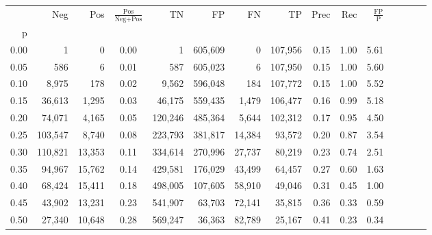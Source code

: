 \begin{tabular}{rrrcrrrrrrrrrrr}
\toprule
{} &      Neg &     Pos & $\frac{\text{Pos}}{\text{Neg}+\text{Pos}}$ &       TN &       FP &       FN &       TP &  Prec &   Rec & $\frac{\text{FP}}{\text{P}}$ \\
p    &          &         &                                            &          &          &          &          &       &       &                              \\
\midrule
0.00 &        1 &       0 &                                       0.00 &        1 &  605,609 &        0 &  107,956 &  0.15 &  1.00 &                         5.61 \\
0.05 &      586 &       6 &                                       0.01 &      587 &  605,023 &        6 &  107,950 &  0.15 &  1.00 &                         5.60 \\
0.10 &    8,975 &     178 &                                       0.02 &    9,562 &  596,048 &      184 &  107,772 &  0.15 &  1.00 &                         5.52 \\
0.15 &   36,613 &   1,295 &                                       0.03 &   46,175 &  559,435 &    1,479 &  106,477 &  0.16 &  0.99 &                         5.18 \\
0.20 &   74,071 &   4,165 &                                       0.05 &  120,246 &  485,364 &    5,644 &  102,312 &  0.17 &  0.95 &                         4.50 \\
0.25 &  103,547 &   8,740 &                                       0.08 &  223,793 &  381,817 &   14,384 &   93,572 &  0.20 &  0.87 &                         3.54 \\
0.30 &  110,821 &  13,353 &                                       0.11 &  334,614 &  270,996 &   27,737 &   80,219 &  0.23 &  0.74 &                         2.51 \\
0.35 &   94,967 &  15,762 &                                       0.14 &  429,581 &  176,029 &   43,499 &   64,457 &  0.27 &  0.60 &                         1.63 \\
0.40 &   68,424 &  15,411 &                                       0.18 &  498,005 &  107,605 &   58,910 &   49,046 &  0.31 &  0.45 &                         1.00 \\
0.45 &   43,902 &  13,231 &                                       0.23 &  541,907 &   63,703 &   72,141 &   35,815 &  0.36 &  0.33 &                         0.59 \\
0.50 &   27,340 &  10,648 &                                       0.28 &  569,247 &   36,363 &   82,789 &   25,167 &  0.41 &  0.23 &                         0.34 \\

\end{tabular}
